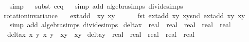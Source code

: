 \begin{isabellebody}
%
\isadelimproof
\ \ %
\endisadelimproof
%
\isatagproof
{}\isamarkupfalse%
{\isacharparenleft}simp{\isacharparenright}\isanewline
\ \ \isamarkupfalse%
{\isacharparenleft}subst\ c{\isacharunderscore}eq{\isacharunderscore}{}{\isacharparenright}{\isacharplus}\isanewline
\ \ \isamarkupfalse%
{\isacharparenleft}simp\ add{\isacharcolon}\ algebra{\isacharunderscore}simps\ divide{\isacharunderscore}simps{\isacharparenright}%
\endisatagproof
{\isafoldproof}%
%
\isadelimproof
\isanewline
%
\endisadelimproof
\isanewline
{}\isamarkupfalse%
\ rotation{\isacharunderscore}invariance{\isacharunderscore}{}{\isacharcolon}\ \isanewline
\ \ {\isachardoublequoteopen}ext{\isacharunderscore}add\ {\isacharparenleft}{\isasymrho}\ {\isacharparenleft}x{}{\isacharcomma}y{}{\isacharparenright}{\isacharparenright}\ {\isacharparenleft}x{}{\isacharcomma}y{}{\isacharparenright}\ {\isacharequal}\ \isanewline
\ \ \ {\isasymrho}\ {\isacharparenleft}fst\ {\isacharparenleft}ext{\isacharunderscore}add\ {\isacharparenleft}x{}{\isacharcomma}y{}{\isacharparenright}\ {\isacharparenleft}x{}{\isacharcomma}y{}{\isacharparenright}{\isacharparenright}{\isacharcomma}snd\ {\isacharparenleft}ext{\isacharunderscore}add\ {\isacharparenleft}x{}{\isacharcomma}y{}{\isacharparenright}\ {\isacharparenleft}x{}{\isacharcomma}y{}{\isacharparenright}{\isacharparenright}{\isacharparenright}{\isachardoublequoteclose}\isanewline
%
\isadelimproof
\ \ %
\endisadelimproof
%
\isatagproof
{}\isamarkupfalse%
{\isacharparenleft}simp\ add{\isacharcolon}\ algebra{\isacharunderscore}simps\ divide{\isacharunderscore}simps{\isacharparenright}%
\endisatagproof
{\isafoldproof}%
%
\isadelimproof
\isanewline
%
\endisadelimproof
\isanewline
{}\isamarkupfalse%
\ delta{\isacharunderscore}x\ {\isacharcolon}{\isacharcolon}\ {\isachardoublequoteopen}real\ {\isasymRightarrow}\ real\ {\isasymRightarrow}\ real\ {\isasymRightarrow}\ real\ {\isasymRightarrow}\ real{\isachardoublequoteclose}\ \isanewline
\ \ {\isachardoublequoteopen}delta{\isacharunderscore}x\ x{}\ y{}\ x{}\ y{}\ {\isacharequal}\ x{}{\isacharasterisk}y{}\ {\isacharminus}\ x{}{\isacharasterisk}y{}{\isachardoublequoteclose}\isanewline
{}\isamarkupfalse%
\ delta{\isacharunderscore}y\ {\isacharcolon}{\isacharcolon}\ {\isachardoublequoteopen}real\ {\isasymRightarrow}\ real\ {\isasymRightarrow}\ real\ {\isasymRightarrow}\ real\ {\isasymRightarrow}\ real{\isachardoublequoteclose}\ \isanewline

\end{isabellebody}
